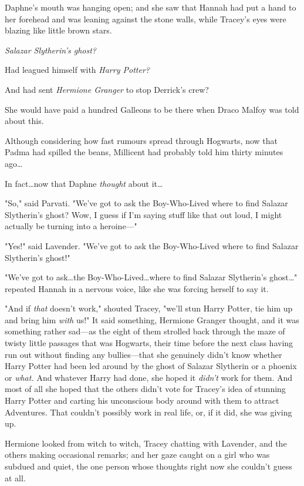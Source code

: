 Daphne's mouth was hanging open; and she saw that Hannah had put a hand to her
forehead and was leaning against the stone walls, while Tracey's eyes were
blazing like little brown stars.

\emph{Salazar Slytherin's ghost?}

Had leagued himself with \emph{Harry Potter?}

And had sent \emph{Hermione Granger} to stop Derrick's crew?

She would have paid a hundred Galleons to be there when Draco Malfoy was told
about this.

Although considering how fast rumours spread through Hogwarts, now that Padma
had spilled the beans, Millicent had probably told him thirty minutes
ago…

In fact…now that Daphne \emph{thought} about it…

"So," said Parvati. "We've got to ask the Boy-Who-Lived where to find Salazar
Slytherin's ghost? Wow, I guess if I'm saying stuff like that out loud, I might
actually be turning into a heroine—"

"Yes!" said Lavender. "We've got to ask the Boy-Who-Lived where to find Salazar
Slytherin's ghost!"

"We've got to ask…the Boy-Who-Lived…where to find Salazar
Slytherin's ghost…" repeated Hannah in a nervous voice, like she was
forcing herself to say it.

"And if \emph{that} doesn't work," shouted Tracey, "we'll stun Harry Potter,
tie him up and bring him \emph{with} us!"
\later
It said something, Hermione Granger thought, and it was something rather
sad—as the eight of them strolled back through the maze of twisty little
passages that was Hogwarts, their time before the next class having run out
without finding any bullies—that she genuinely didn't know whether Harry
Potter had been led around by the ghost of Salazar Slytherin or a phoenix or
\emph{what.} And whatever Harry had done, she hoped it \emph{didn't} work for
them. And most of all she hoped that the others didn't vote for Tracey's idea
of stunning Harry Potter and carting his unconscious body around with them to
attract Adventures. That couldn't possibly work in real life, or, if it did,
she was giving up.

Hermione looked from witch to witch, Tracey chatting with Lavender, and the
others making occasional remarks; and her gaze caught on a girl who was subdued
and quiet, the one person whose thoughts right now she couldn't guess at all.

